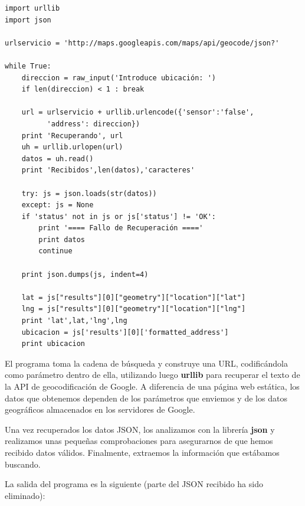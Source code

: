 \beforeverb
\begin{verbatim}
import urllib
import json

urlservicio = 'http://maps.googleapis.com/maps/api/geocode/json?'

while True:
    direccion = raw_input('Introduce ubicación: ')
    if len(direccion) < 1 : break

    url = urlservicio + urllib.urlencode({'sensor':'false', 
          'address': direccion})
    print 'Recuperando', url
    uh = urllib.urlopen(url)
    datos = uh.read()
    print 'Recibidos',len(datos),'caracteres'

    try: js = json.loads(str(datos))
    except: js = None
    if 'status' not in js or js['status'] != 'OK':
        print '==== Fallo de Recuperación ===='
        print datos
        continue

    print json.dumps(js, indent=4)

    lat = js["results"][0]["geometry"]["location"]["lat"]
    lng = js["results"][0]["geometry"]["location"]["lng"]
    print 'lat',lat,'lng',lng
    ubicacion = js['results'][0]['formatted_address']
    print ubicacion
\end{verbatim}
\afterverb
%
El programa toma la cadena de búsqueda y construye una URL,
codificándola como parámetro dentro de ella, utilizando luego
{\bf urllib} para recuperar el texto de la API de geocodificación de Google.
A diferencia de una página web estática, los datos que obtenemos dependen de los
parámetros que enviemos y de los datos geográficos almacenados en los servidores de Google.

Una vez recuperados los datos JSON, los analizamos con la librería
{\bf json} y realizamos unas pequeñas comprobaciones para asegurarnos de que hemos recibido
datos válidos. Finalmente, extraemos la información que estábamos buscando.

La salida del programa es la siguiente (parte del JSON recibido
ha sido eliminado):

